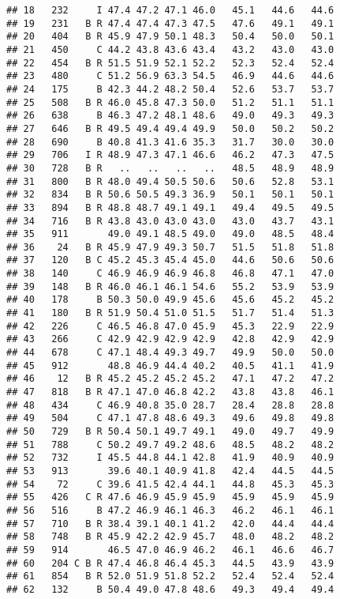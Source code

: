 \documentclass[]{article}
\begin{document}
\begin{verbatim}
## 18   232     I 47.4 47.2 47.1 46.0   45.1   44.6   44.6
## 19   231   B R 47.4 47.4 47.3 47.5   47.6   49.1   49.1
## 20   404   B R 45.9 47.9 50.1 48.3   50.4   50.0   50.1
## 21   450     C 44.2 43.8 43.6 43.4   43.2   43.0   43.0
## 22   454   B R 51.5 51.9 52.1 52.2   52.3   52.4   52.4
## 23   480     C 51.2 56.9 63.3 54.5   46.9   44.6   44.6
## 24   175     B 42.3 44.2 48.2 50.4   52.6   53.7   53.7
## 25   508   B R 46.0 45.8 47.3 50.0   51.2   51.1   51.1
## 26   638     B 46.3 47.2 48.1 48.6   49.0   49.3   49.3
## 27   646   B R 49.5 49.4 49.4 49.9   50.0   50.2   50.2
## 28   690     B 40.8 41.3 41.6 35.3   31.7   30.0   30.0
## 29   706   I R 48.9 47.3 47.1 46.6   46.2   47.3   47.5
## 30   728   B R   ..   ..   ..   ..   48.5   48.9   48.9
## 31   800   B R 48.0 49.4 50.5 50.6   50.6   52.8   53.1
## 32   834   B R 50.6 50.5 49.3 36.9   50.1   50.1   50.1
## 33   894   B R 48.8 48.7 49.1 49.1   49.4   49.5   49.5
## 34   716   B R 43.8 43.0 43.0 43.0   43.0   43.7   43.1
## 35   911       49.0 49.1 48.5 49.0   49.0   48.5   48.4
## 36    24   B R 45.9 47.9 49.3 50.7   51.5   51.8   51.8
## 37   120   B C 45.2 45.3 45.4 45.0   44.6   50.6   50.6
## 38   140     C 46.9 46.9 46.9 46.8   46.8   47.1   47.0
## 39   148   B R 46.0 46.1 46.1 54.6   55.2   53.9   53.9
## 40   178     B 50.3 50.0 49.9 45.6   45.6   45.2   45.2
## 41   180   B R 51.9 50.4 51.0 51.5   51.7   51.4   51.3
## 42   226     C 46.5 46.8 47.0 45.9   45.3   22.9   22.9
## 43   266     C 42.9 42.9 42.9 42.9   42.8   42.9   42.9
## 44   678     C 47.1 48.4 49.3 49.7   49.9   50.0   50.0
## 45   912       48.8 46.9 44.4 40.2   40.5   41.1   41.9
## 46    12   B R 45.2 45.2 45.2 45.2   47.1   47.2   47.2
## 47   818   B R 47.1 47.0 46.8 42.2   43.8   43.8   46.1
## 48   434     C 46.9 40.8 35.0 28.7   28.4   28.8   28.8
## 49   504     C 47.1 47.8 48.6 49.3   49.6   49.8   49.8
## 50   729   B R 50.4 50.1 49.7 49.1   49.0   49.7   49.9
## 51   788     C 50.2 49.7 49.2 48.6   48.5   48.2   48.2
## 52   732     I 45.5 44.8 44.1 42.8   41.9   40.9   40.9
## 53   913       39.6 40.1 40.9 41.8   42.4   44.5   44.5
## 54    72     C 39.6 41.5 42.4 44.1   44.8   45.3   45.3
## 55   426   C R 47.6 46.9 45.9 45.9   45.9   45.9   45.9
## 56   516     B 47.2 46.9 46.1 46.3   46.2   46.1   46.1
## 57   710   B R 38.4 39.1 40.1 41.2   42.0   44.4   44.4
## 58   748   B R 45.9 42.2 42.9 45.7   48.0   48.2   48.2
## 59   914       46.5 47.0 46.9 46.2   46.1   46.6   46.7
## 60   204 C B R 47.4 46.8 46.4 45.3   44.5   43.9   43.9
## 61   854   B R 52.0 51.9 51.8 52.2   52.4   52.4   52.4
## 62   132     B 50.4 49.0 47.8 48.6   49.3   49.4   49.4

\end{verbatim}
\end{document}
